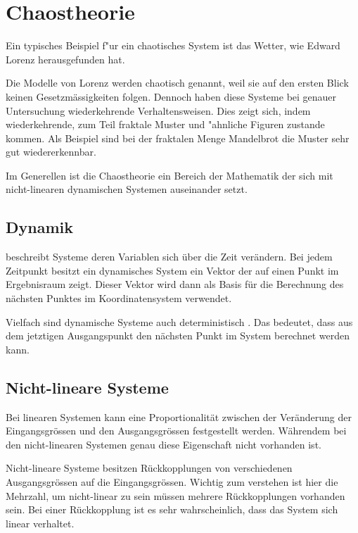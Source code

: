 
\section{Chaostheorie}
Ein typisches Beispiel f"ur ein chaotisches System ist das Wetter, wie Edward Lorenz herausgefunden hat. 

Die Modelle von Lorenz werden chaotisch genannt, weil sie auf den ersten Blick keinen Gesetzmässigkeiten folgen. Dennoch haben diese Systeme bei genauer Untersuchung wiederkehrende Verhaltensweisen. Dies zeigt sich, indem wiederkehrende, zum Teil fraktale Muster und "ahnliche Figuren zustande kommen. Als Beispiel sind bei der fraktalen Menge Mandelbrot die Muster sehr gut wiedererkennbar. 

Im Generellen ist die Chaostheorie ein Bereich der Mathematik der sich mit nicht-linearen dynamischen Systemen auseinander setzt.

\subsection{Dynamik} beschreibt Systeme deren Variablen sich über die Zeit verändern. Bei jedem Zeitpunkt besitzt ein dynamisches System ein Vektor der auf einen Punkt im Ergebnisraum zeigt. Dieser Vektor wird dann als Basis für die Berechnung des nächsten Punktes im Koordinatensystem verwendet.

Vielfach sind dynamische Systeme auch deterministisch \cite{wikidynamicalsystems}. Das bedeutet, dass aus dem jetztigen Ausgangspunkt den nächsten Punkt im System berechnet werden kann.


\subsection{Nicht-lineare Systeme} %
Bei linearen Systemen kann eine Proportionalität zwischen der Veränderung der Eingangsgrössen und den Ausgangsgrössen festgestellt werden. Währendem bei den nicht-linearen Systemen genau diese Eigenschaft nicht vorhanden ist.

Nicht-lineare Systeme besitzen Rückkopplungen von verschiedenen Ausgangsgrössen auf die Eingangsgrössen. Wichtig zum verstehen ist hier die Mehrzahl, um nicht-linear zu sein müssen mehrere Rückkopplungen vorhanden sein. Bei einer Rückkopplung ist es sehr wahrscheinlich, dass das System sich linear verhaltet.

